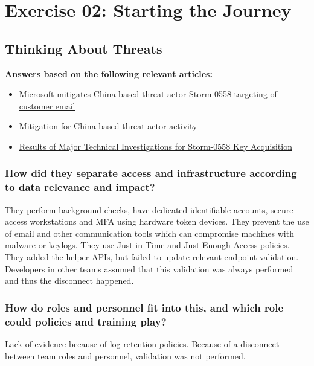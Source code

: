 \section{Exercise 02: Starting the Journey}
\subsection{Thinking About Threats}
\textbf{Answers based on the following relevant articles:}\\
\begin{itemize}
    \item \href{https://msrc.microsoft.com/blog/2023/07/microsoft-mitigates-china-based-threat-actor-storm-0558-targeting-of-customer-email/}{Microsoft mitigates China-based threat actor Storm-0558 targeting of customer email}
    \item \href{https://blogs.microsoft.com/on-the-issues/2023/07/11/mitigation-china-based-threat-actor/}{Mitigation for China-based threat actor activity}
    \item \href{https://msrc.microsoft.com/blog/2023/09/results-of-major-technical-investigations-for-storm-0558-key-acquisition/}{Results of Major Technical Investigations for Storm-0558 Key Acquisition}
\end{itemize}


\subsubsection{How did they separate access and infrastructure according to data relevance and impact?}
They perform background checks, have dedicated identifiable accounts, secure access workstations and MFA using hardware token devices. They prevent the use of email and other communication tools which can compromise machines with malware or keylogs. They use Just in Time and Just Enough Access policies. They added the helper APIs, but failed to update relevant endpoint validation. Developers in other teams assumed that this validation was always performed and thus the disconnect happened.

\subsubsection{How do roles and personnel fit into this, and which role could policies and training play?}
Lack of evidence because of log retention policies. Because of a disconnect between team roles and personnel, validation was not performed.


